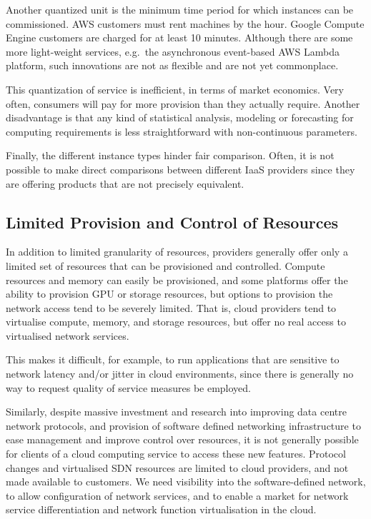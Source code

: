\documentclass[conference,10pt]{IEEEtran}
\begin{document}
Another quantized unit is the minimum time period for which instances can be commissioned. AWS customers must rent machines by the hour. Google Compute Engine customers are charged for at least 10 minutes.
Although there are some more light-weight services, e.g.\ the asynchronous event-based AWS Lambda platform, such innovations are not as flexible and are not yet commonplace.

This quantization of service is inefficient, in terms of market economics. Very often, consumers will pay for more provision than they actually require. Another disadvantage is that any kind of statistical analysis, modeling or forecasting for computing requirements is less straightforward with non-continuous parameters. 

Finally, the different instance types hinder fair comparison. Often, it is not possible to make direct comparisons between different IaaS providers since they are offering products that are not precisely equivalent.


\subsection{Limited Provision and Control of Resources}

In addition to limited granularity of resources, providers generally offer
only a limited set of resources that can be provisioned and controlled. 
Compute resources and memory can easily be provisioned, and some platforms
offer the ability to provision GPU or storage resources, but options to
provision the network access tend to be severely limited. That is, cloud
providers tend to virtualise compute, memory, and storage resources, but
offer no real access to virtualised network services. 

This makes it difficult, for example, to run applications that are
sensitive to network latency and/or jitter in cloud environments, since
there is generally no way to request quality of service measures be
employed. 

Similarly, despite massive investment and research into improving data
centre network protocols, and provision of software defined networking
infrastructure to ease management and improve control over resources, 
it is not generally possible for clients of a cloud computing service
to access these new features. Protocol changes and virtualised SDN 
resources are limited to cloud providers, and not made available to
customers. We need visibility into the software-defined network, to
allow configuration of network services, and to enable a market for
network service differentiation and network function virtualisation
in the cloud. 
\end{document}
